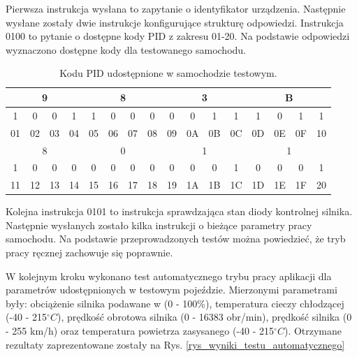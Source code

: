 \documentclass[12pt]{article} %
\numberwithin{equation}{subsection}
\numberwithin{figure}{section}
\numberwithin{table}{section}
\begin{document}
		Pierwsza instrukcja wysłana to zapytanie o identyfikator urządzenia. Następnie wysłane zostały dwie instrukcje konfigurujące strukturę odpowiedzi. Instrukcja 0100 to pytanie o dostępne kody PID z zakresu 01-20. Na podstawie odpowiedzi wyznaczono dostępne kody dla testowanego samochodu.
		
\begin{table}[!h]
\centering
\caption{Kodu PID udostępnione w samochodzie testowym.}
\label{tabela_test_pids}
\begin{tabular}{|c|c|c|c|c|c|c|c|c|c|c|c|c|c|c|c|}
\hline
\multicolumn{4}{|c|}{9} & \multicolumn{4}{c|}{8} & \multicolumn{4}{c|}{3} & \multicolumn{4}{c|}{B} \\ \hline
1    & 0    & 0   & 1   & 1    & 0   & 0   & 0   & 0    & 0   & 1   & 1   & 1    & 0   & 1   & 1   \\ \hline
01   & 02   & 03  & 04  & 05   & 06  & 07  & 08  & 09   & 0A  & 0B  & 0C  & 0D   & 0E  & 0F  & 10  \\ \hline \hline
\multicolumn{4}{|c|}{8} & \multicolumn{4}{c|}{0} & \multicolumn{4}{c|}{1} & \multicolumn{4}{c|}{1} \\ \hline
1    & 0    & 0   & 0   & 0    & 0   & 0   & 0   & 0    & 0   & 0   & 1   & 0    & 0   & 0   & 1   \\ \hline
11   & 12   & 13  & 14  & 15   & 16  & 17  & 18  & 19   & 1A  & 1B  & 1C  & 1D   & 1E  & 1F  & 20  \\ \hline
\end{tabular}
\end{table}

	
	
	\newpage
	
	Kolejna instrukcja 0101 to instrukcja sprawdzająca stan diody kontrolnej silnika. Następnie wysłanych zostało kilka instrukcji o bieżące parametry pracy samochodu. Na podstawie przeprowadzonych testów można powiedzieć, że tryb pracy ręcznej zachowuje się poprawnie.	
	
	W kolejnym kroku wykonano test automatycznego trybu pracy aplikacji dla parametrów udostępnionych w testowym pojeździe. Mierzonymi parametrami były: obciążenie silnika podawane w (0 - 100\%), temperatura cieczy chłodzącej (-40 - 215${}^\circ C$), prędkość obrotowa silnika (0 - 16383 obr/min), prędkość silnika (0 - 255 km/h) oraz temperatura powietrza zasysanego (-40 - 215${}^\circ C$). Otrzymane rezultaty zaprezentowane zostały na Rys. \ref{rys_wyniki_testu_automatycznego}
	
\end{document}
